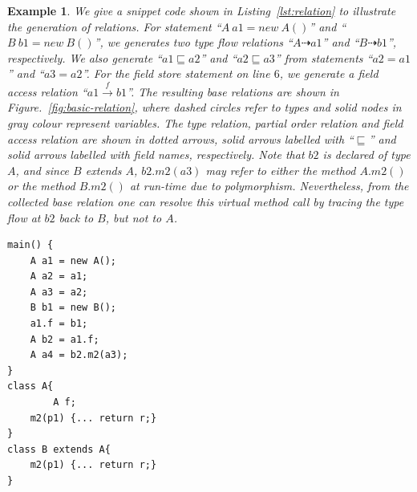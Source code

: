 \documentclass{fac}
\newtheorem{Example}{Example}
\newcommand{\less}{\sqsubseteq}
\newcommand{\tflow}{\dashrightarrow}
\newcommand{\hflow}{\longrightarrow}
\newcommand{\lhflow}[1]{\stackrel{#1}{\hflow}}
\begin{document}
\begin{Example}\label{ex:def1}
We give a snippet code shown in Listing~\ref{lst:relation} to illustrate the generation of relations. For statement ``$A\ a1=new \ A()$'' and ``$B\ b1=new\ B()$'', we generates two type flow relations ``$A \tflow a1$'' and ``$B \tflow b1$'', respectively. We also generate ``$a1 \less a2$'' and ``$a2 \less a3$'' from statements ``$a2=a1$'' and ``$a3=a2$''. For the field store statement on line $6$, we generate a field access relation ``$a1 \lhflow{f} b1$''. The resulting base relations are shown in Figure.~\ref{fig:basic-relation}, where dashed circles refer to types and solid nodes in gray colour represent variables. The type relation, partial order relation and field access relation are shown in dotted arrows, solid arrows labelled with ``$\less$'' and solid arrows labelled with field names, respectively.
Note that $b2$ is declared of type $A$, and since $B$ extends $A$, $b2.m2(a3)$ may refer to either the method $A.m2()$ or the method $B.m2()$ at run-time due to polymorphism. Nevertheless, from the collected base relation one can resolve this virtual method call by tracing the type flow at $b2$ back to $B$, but not to $A$.
\end{Example}
\begin{lstlisting}[caption={An example showing the generation of base relations},label={lst:relation}]
main() {
	A a1 = new A();
	A a2 = a1;
	A a3 = a2;
	B b1 = new B();
	a1.f = b1;
	A b2 = a1.f;
	A a4 = b2.m2(a3);
}
class A{
        A f;
 	m2(p1) {... return r;}
}
class B extends A{
	m2(p1) {... return r;}
}
\end{lstlisting}
\end{document}
